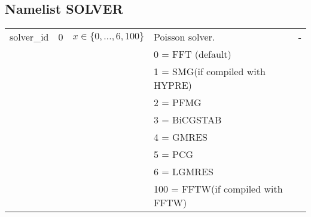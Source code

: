 \documentclass[twoside,11pt,fleqn,a4paper,english,openright]{report}
\begin{document}
\subsection{Namelist SOLVER}\label{par:solver}
\begin{center}
  \tablelasttail{
        &&&&\\\hline
  }
\begin{supertabular}{|l|p{2cm}|p{4cm}|p{6cm}|l|}
  solver\_id    & 0        &  $x\in\{ 0,...,6, 100 \}$    & Poisson solver. & -\\
        & & & 0 = FFT (default) & \\
  	& & & 1 = SMG(if compiled with HYPRE) & \\
  	& & & 2 = PFMG  & \\
  	& & & 3 = BiCGSTAB & \\
        & & & 4 = GMRES & \\
        & & & 5 = PCG & \\
        & & & 6 = LGMRES & \\
      	& & & 100 = FFTW(if compiled with FFTW) & \\


\end{supertabular}
\end{center}
\end{document}
